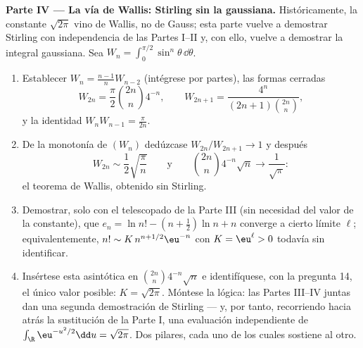 \begin{problem}
\medskip
\noindent\textbf{Parte IV --- La vía de Wallis: Stirling sin la
gaussiana.} Históricamente, la constante $\sqrt{2\pi}$ vino de Wallis,
no de Gauss; esta parte vuelve a demostrar Stirling con independencia de
las Partes I--II y, con ello, vuelve a demostrar la integral gaussiana.
Sea $W_n = \int_0^{\pi/2}\sin^n\theta\,
\dd\theta$.
\begin{enumerate}[resume]
  \item Establecer $W_n = \frac{n-1}nW_{n-2}$ (intégrese por partes),
  las formas cerradas
        \[
        W_{2n} = \frac\pi2\binom{2n}n4^{-n}, \qquad
        W_{2n+1} = \frac{4^n}{(2n+1)\binom{2n}n},
        \]
        y la identidad $W_nW_{n-1} = \frac\pi{2n}$. \item De la
        monotonía de $(W_n)$ dedúzcase $W_{2n}/W_{2n+1} \to 1$ y después
        \[
        W_{2n} \sim \frac12\sqrt{\frac\pi n}
        \qquad\text{y}\qquad
        \binom{2n}n4^{-n}\sqrt n \longrightarrow
        \frac1{\sqrt\pi} :
        \]
        el teorema de Wallis, obtenido sin Stirling. \item Demostrar,
        solo con el telescopado de la Parte III (sin necesidad del valor
        de la constante), que $e_n = \ln n! - (n +
        \frac12)\ln n + n$ converge a cierto límite $\ell$;
        equivalentemente, $n! \sim K\,n^{n+1/2}\eu^{-n}$ con $K =
        \eu^\ell > 0$ todavía sin identificar. \item Insértese esta
        asintótica en $\binom{2n}n4^{-n}\sqrt n$ e identifíquese, con la
        pregunta 14, el único valor posible: $K = \sqrt{2\pi}$. Móntese
        la lógica: las Partes III--IV juntas dan una segunda
        demostración  de
        Stirling --- y, por tanto, recorriendo hacia atrás la
        sustitución de la Parte I, una evaluación independiente de
        $\int_\R\eu^{-u^2/2}\dd u = \sqrt{2\pi}$. Dos pilares, cada uno
        de los cuales sostiene al otro.
\end{enumerate}


\end{problem}
